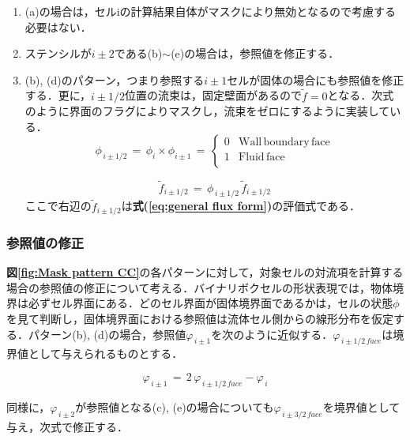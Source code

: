 \begin{enumerate}
\item (a)の場合は，セルiの計算結果自体がマスクにより無効となるので考慮する必要はない．
\item ステンシルが$i\pm2$である(b)$\sim$(e)の場合は，参照値を修正する．
\item (b), (d)のパターン，つまり参照する$i\pm1$セルが固体の場合にも参照値を修正する．更に，$i\pm1/2$位置の流束は，固定壁面があるので$\tilde{f}=0$となる．次式のように界面のフラグによりマスクし，流束をゼロにするように実装している．
\begin{equation}
\phi_{\,i\pm1/2} \,=\, \phi_{i} \times \phi_{i\pm1} \,=\, \left\{
\begin{array}{ll}
0 & \mathrm{Wall\, boundary\, face}\\
1 & \mathrm{Fluid\, face}\\
\end{array} \right.
\label{eq:mask at cell face}
\end{equation}

\begin{equation}
\tilde{f}_{i\pm1/2} \,=\, \phi_{\,i\pm1/2} \, \tilde{f}_{i\pm1/2}
\label{eq:wall vel at cell face}
\end{equation}
\noindent ここで右辺の$\tilde{f}_{i\pm1/2}$は\textbf{式(\ref{eq:general flux form})}の評価式である．
\end{enumerate}

%
\subsubsection{参照値の修正}
\textbf{図\ref{fig:Mask pattern CC}}の各パターンに対して，対象セルの対流項を計算する場合の参照値の修正について考える．バイナリボクセルの形状表現では，物体境界は必ずセル界面にある．どのセル界面が固体境界面であるかは，セルの状態$\phi$を見て判断し，固体境界面における参照値は流体セル側からの線形分布を仮定する．パターン(b), (d)の場合，参照値$\varphi_{\,i\pm1}$を次のように近似する．$\varphi_{\,i\pm1/2\, face}$は境界値として与えられるものとする．

\begin{equation}
\varphi_{\,i\pm1} \,=\, 2 \,\varphi_{\,i\pm1/2\, face} - \varphi_{\,i}
\label{eq:solid face reference 1}
\end{equation}

\noindent 同様に，$\varphi_{\,i\pm2}$が参照値となる(c), (e)の場合についても$\varphi_{\,i\pm3/2\, face}$を境界値として与え，次式で修正する．


